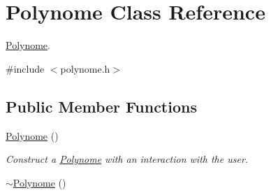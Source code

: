 \hypertarget{class_polynome}{\section{\-Polynome \-Class \-Reference}
\label{class_polynome}
}


\hyperlink{class_polynome}{\-Polynome}.  




{\ttfamily \#include $<$polynome.\-h$>$}

\subsection*{\-Public \-Member \-Functions}
\begin{DoxyCompactItemize}
\item 
\hypertarget{class_polynome_a48fbfd3cd58c7a6ca4d0dd10d31bf06a}{\hyperlink{class_polynome_a48fbfd3cd58c7a6ca4d0dd10d31bf06a}{\-Polynome} ()}\label{class_polynome_a48fbfd3cd58c7a6ca4d0dd10d31bf06a}

\begin{DoxyCompactList}\small\item\em \-Construct a \hyperlink{class_polynome}{\-Polynome} with an interaction with the user. \end{DoxyCompactList}\item 
\hypertarget{class_polynome_a3f3d7da165b91d8cff44dad28ce58fa2}{\hyperlink{class_polynome_a3f3d7da165b91d8cff44dad28ce58fa2}{$\sim$\-Polynome} ()}\label{class_polynome_a3f3d7da165b91d8cff44dad28ce58fa2}


\end{DoxyCompactItemize}
